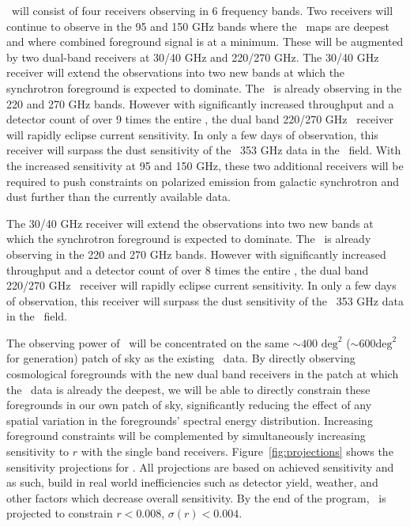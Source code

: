 \documentclass[]{spie}  %
\begin{document}
\biceparray\ will consist of four receivers observing in 6 frequency bands.
Two receivers will continue to observe in the 95 and 150 GHz bands where the
\bk\ maps are deepest and where combined foreground signal is at a minimum.
These will be augmented by two dual-band receivers at 30/40 GHz and 220/270
GHz.  The 30/40 GHz receiver will extend the observations into two new bands at
which the synchrotron foreground is expected to dominate. The \keckarray\ is
already observing in the 220 and 270 GHz bands.  However with significantly
increased throughput and a detector count of over 9 times the entire
\keckarray, the dual band 220/270 GHz \biceparray\ receiver will rapidly
eclipse current sensitivity. In only a few days of observation, this receiver
will surpass the dust sensitivity of the \planck\ 353 GHz data in the \bk\
field. With the increased sensitivity at 95 and 150 GHz, these two additional
receivers will be required to push constraints on polarized emission from
galactic synchrotron and dust further than the currently available data.





The 30/40 GHz receiver will extend the observations into two
new bands at which the synchrotron foreground is expected to dominate. The
\keckarray\ is already observing in the 220 and 270 GHz bands.  However with
significantly increased throughput and a detector count of over 8 times the
entire \keckarray, the dual band 220/270 GHz \biceparray\ receiver will rapidly
eclipse current sensitivity. In only a few days of observation,
this receiver will surpass the dust sensitivity of the \planck\ 353 GHz data in
the \bk\ field. 

The observing power of \biceparray\ will be concentrated on the same $\sim400
\text{ deg}^2$ ($\sim 600 \text{deg}^2$ for \bicep3 generation) patch of sky as the existing \bk\ data. By directly
observing cosmological foregrounds with the new dual band receivers in the
patch at which the \bk\ data is already the deepest, we will be able to
directly constrain these foregrounds in our own patch of sky, significantly
reducing the effect of any spatial variation in the foregrounds' spectral
energy distribution. Increasing foreground constraints will be complemented by
simultaneously increasing sensitivity to $r$ with the single band receivers. Figure~\ref{fig:projections} shows the sensitivity projections for \biceparray. All projections are based on achieved sensitivity and as such, build in real world inefficiencies such as detector yield, weather, and other factors which decrease overall sensitivity. By the end of the program, \biceparray\ is projected to constrain $r<0.008$, $\sigma (r)<0.004$.
\end{document}
